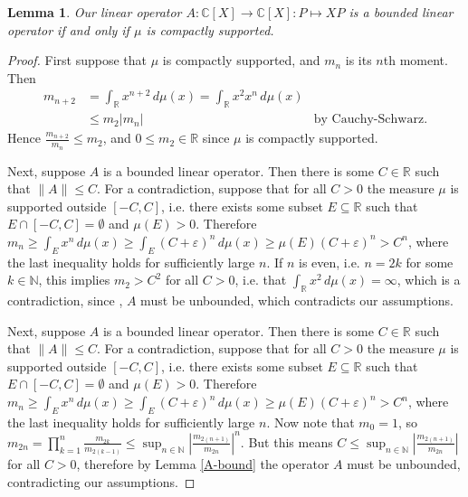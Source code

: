 \documentclass[12pt,oneside]{report}
\newtheorem{lem}[thm]{Lemma}
\begin{document}
\begin{lem}
    Our linear operator $A: \mathbb{C}[X] \to \mathbb{C}[X]: P \mapsto XP$ is a bounded linear operator if and only if $\mu$ is compactly supported.
\end{lem}
\begin{proof}
    First suppose that $\mu$ is compactly supported, and $m_{n}$ is its $n$th moment. Then 
    \begin{align*}
        m_{n+2} &= \int_{\mathbb{R}} x^{n+2} \, d\mu(x) = \int _{\mathbb{R}} x^{2}x^{n} \, d\mu(x) \\
        &\leq m_{2}|m_{n}| & \text{by Cauchy-Schwarz.}
    \end{align*}
    Hence $\frac{m_{n+2}}{m_{n}} \leq m_{2}$, and $0 \leq m_{2} \in \mathbb{R}$ since $\mu$ is compactly supported.

    Next, suppose $A$ is a bounded linear operator. Then there is some $C \in \mathbb{R}$ such that $\|A\| \leq C$. For a contradiction, suppose that for all $C > 0$ the measure $\mu$ is supported outside $[-C, C]$, i.e. there exists some subset $E \subseteq \mathbb{R}$ such that $E \cap [-C, C] = \emptyset$ and $\mu(E) > 0$. Therefore $m_{n} \geq \int _{E} x^{n} \, d\mu(x) \geq \int _{E} (C + \varepsilon)^{n} \, d\mu(x) \geq \mu(E)(C + \varepsilon)^{n} > C^{n}$, where the last inequality holds for sufficiently large $n$. If $n$ is even, i.e. $n = 2k$ for some $k \in \mathbb{N}$, this implies $m_2 > C^{2}$ for all $C > 0$, i.e. that $\int_{\mathbb{R}} x^2 \, d\mu(x) = \infty$, which is a contradiction, since , $A$ must be unbounded, which contradicts our assumptions.

    Next, suppose $A$ is a bounded linear operator. Then there is some $C \in \mathbb{R}$ such that $\|A\| \leq C$. For a contradiction, suppose that for all $C > 0$ the measure $\mu$ is supported outside $[-C, C]$, i.e. there exists some subset $E \subseteq \mathbb{R}$ such that $E \cap [-C, C] = \emptyset$ and $\mu(E) > 0$. Therefore $m_{n} \geq \int _{E} x^{n} \, d\mu(x) \geq \int _{E} (C + \varepsilon)^{n} \, d\mu(x) \geq \mu(E)(C + \varepsilon)^{n} > C^{n}$, where the last inequality holds for sufficiently large $n$. Now note that $m_0 = 1$, so $m_{2n} = \prod_{k=1}^{n} \frac{m_{2k}}{m_{2(k-1)}} \leq \sup_{n \in \mathbb{N}} \left| \frac{m_{2(n+1)}}{m_{2n}} \right|^n$. But this means $C \leq \sup_{n \in \mathbb{N}} \left| \frac{m_{2(n+1)}}{m_{2n}} \right|$ for all $C > 0$, therefore by Lemma \ref{A-bound} the operator $A$ must be unbounded, contradicting our assumptions.
\end{proof}
\end{document}
